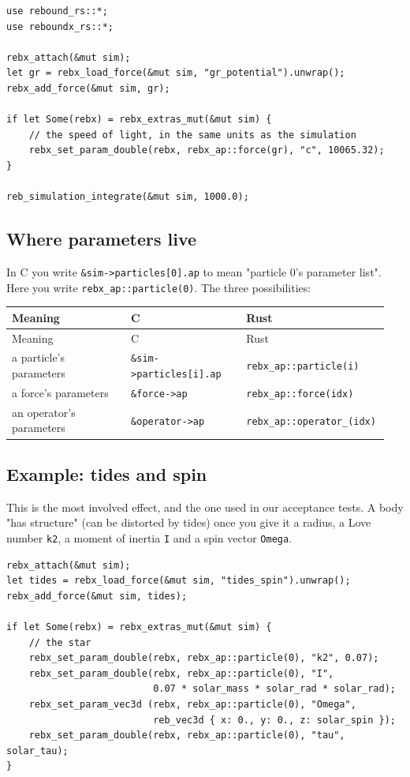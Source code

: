 \documentclass[11pt]{article}
\begin{document}
\begin{lstlisting}
use rebound_rs::*;
use reboundx_rs::*;

rebx_attach(&mut sim);
let gr = rebx_load_force(&mut sim, "gr_potential").unwrap();
rebx_add_force(&mut sim, gr);

if let Some(rebx) = rebx_extras_mut(&mut sim) {
    // the speed of light, in the same units as the simulation
    rebx_set_param_double(rebx, rebx_ap::force(gr), "c", 10065.32);
}

reb_simulation_integrate(&mut sim, 1000.0);
\end{lstlisting}

\subsection{Where parameters live}

In C you write \texttt{\&sim->particles[0].ap} to mean "particle 0's parameter list". Here you write \texttt{rebx\_ap::particle(0)}. The three possibilities:

\begin{longtable}{L{0.317\linewidth}L{0.303\linewidth}L{0.330\linewidth}}
\toprule
Meaning & C & Rust \\
\midrule
\endfirsthead
\toprule
Meaning & C & Rust \\
\midrule
\endhead
a particle's parameters & \texttt{\&sim->particles[i].ap} & \texttt{rebx\_ap::particle(i)} \\
a force's parameters & \texttt{\&force->ap} & \texttt{rebx\_ap::force(idx)} \\
an operator's parameters & \texttt{\&operator->ap} & \texttt{rebx\_ap::operator\_(idx)} \\
\bottomrule
\end{longtable}

\subsection{Example: tides and spin}

This is the most involved effect, and the one used in our acceptance tests. A body "has structure" (can be distorted by tides) once you give it a radius, a Love number \texttt{k2}, a moment of inertia \texttt{I} and a spin vector \texttt{Omega}.

\begin{lstlisting}
rebx_attach(&mut sim);
let tides = rebx_load_force(&mut sim, "tides_spin").unwrap();
rebx_add_force(&mut sim, tides);

if let Some(rebx) = rebx_extras_mut(&mut sim) {
    // the star
    rebx_set_param_double(rebx, rebx_ap::particle(0), "k2", 0.07);
    rebx_set_param_double(rebx, rebx_ap::particle(0), "I",
                          0.07 * solar_mass * solar_rad * solar_rad);
    rebx_set_param_vec3d (rebx, rebx_ap::particle(0), "Omega",
                          reb_vec3d { x: 0., y: 0., z: solar_spin });
    rebx_set_param_double(rebx, rebx_ap::particle(0), "tau", solar_tau);
}
\end{lstlisting}
\end{document}
